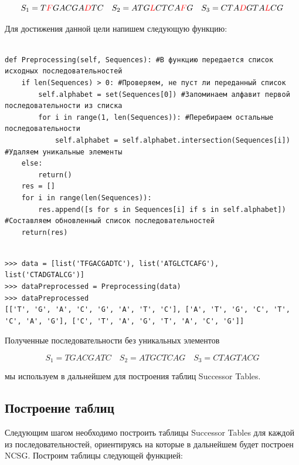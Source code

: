 \documentclass[a4paper,12pt]{extarticle}
\begin{document}
\[S_{1} = T\textcolor{red}{F}GACGA\textcolor{red}{D}TC \quad S_{2} = ATG\textcolor{red}{L}CTCA\textcolor{red}{F}G \quad S_{3} = CTA\textcolor{red}{D}GTA\textcolor{red}{L}CG\]

Для достижения данной цели напишем следующую функцию:

\begin{verbatim}

def Preprocessing(self, Sequences): #В функцию передается список исходных последовательностей
    if len(Sequences) > 0: #Проверяем, не пуст ли переданный список
        self.alphabet = set(Sequences[0]) #Запоминаем алфавит первой последовательности из списка
        for i in range(1, len(Sequences)): #Перебираем остальные последовательности
            self.alphabet = self.alphabet.intersection(Sequences[i]) #Удаляем уникальные элементы
    else:
        return()
    res = []
    for i in range(len(Sequences)):
        res.append([s for s in Sequences[i] if s in self.alphabet]) #Составляем обновленный список последовательностей
    return(res)

\end{verbatim}

\begin{verbatim}

>>> data = [list('TFGACGADTC'), list('ATGLCTCAFG'), list('CTADGTALCG')]
>>> dataPreprocessed = Preprocessing(data)
>>> dataPreprocessed
[['T', 'G', 'A', 'C', 'G', 'A', 'T', 'C'], ['A', 'T', 'G', 'C', 'T', 'C', 'A', 'G'], ['C', 'T', 'A', 'G', 'T', 'A', 'C', 'G']]

\end{verbatim}

Полученные последовательности без уникальных элементов

\[S_{1} = TGACGATC \quad S_{2} = ATGCTCAG \quad S_{3} = CTAGTACG\]

мы используем в дальнейшем для построения таблиц Successor Tables.

\subsection{Построение таблиц}

Следующим шагом необходимо построить таблицы Successor Tables для каждой из последовательностей, ориентируясь на которые в дальнейшем будет построен NCSG. Построим таблицы следующей функцией:
\end{document}
